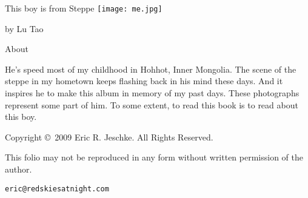 %
%
% 


{\huge This boy is from Steppe}
\texttt{[image: me.jpg]}

\begin{flushright}
{\Large by Lu Tao}
\end{flushright}
\newpage


\vspace*{1in}
{\LARGE About}
\vspace*{0.25in}

He's speed most of my childhood in Hohhot, Inner Mongolia. 
The scene of the steppe in my hometown keeps flashing back in his mind these days.  
And it inspires he to make this album in memory of my past days.
These photographs represent some part of him.
To some extent, to read this book is to read about this boy.

\vspace*{1.0in}

{\large Copyright \copyright \  2009 Eric R. Jeschke.  All Rights Reserved.}

This folio may not be reproduced in any form without written permission
of the author. 

{\tt eric@redskiesatnight.com}

\newpage

{ 
\pagecolor{photopagecol}

\newpage

\newpage

\newpage

\newpage

\newpage

\newpage

\newpage

\newpage

\newpage

\newpage

\newpage
}

